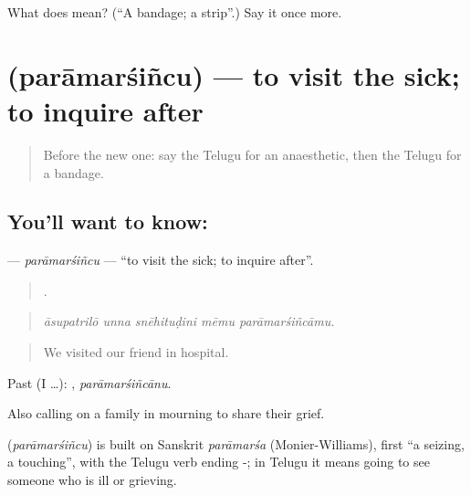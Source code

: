 \begin{tcolorbox}[breakable,colback=teal!4,colframe=teal!35!black,title={Before you move on}]
What does  mean? (\textquotedblleft{}A bandage; a strip\textquotedblright{}.) Say it once more.
\end{tcolorbox}
\section[\texorpdfstring{\te{పరామర్శించు} (parāmarśiñcu)}{పరామర్శించు (parāmarśiñcu)}]{ (parāmarśiñcu) — to visit the sick; to inquire after}

\label{lesson:TE-C519-paramarsincu}



\begin{quote}
Before the new one: say the Telugu for an anaesthetic, then the Telugu for a bandage.
\end{quote}

\subsection*{You'll want to know: }
\textbf{} — \emph{parāmarśiñcu} — \textquotedblleft{}to visit the sick; to inquire after\textquotedblright{}.

\begin{quote}
    .
\end{quote}

\begin{quote}
\emph{āsupatrilō unna snēhituḍini mēmu parāmarśiñcāmu.}
\end{quote}

\begin{quote}
We visited our friend in hospital.
\end{quote}

Past (I …): , \emph{parāmarśiñcānu}.

Also calling on a family in mourning to share their grief.

\begin{cousinweb}
\textbf{} (\emph{parāmarśiñcu}) is built on Sanskrit \emph{parāmarśa} (Monier-Williams), first \textquotedblleft{}a seizing, a touching\textquotedblright{}, with the Telugu verb ending -; in Telugu it means going to see someone who is ill or grieving.
\end{cousinweb}

